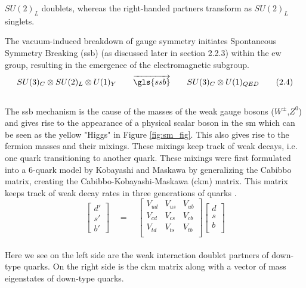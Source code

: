 $SU(2)_{L}$ doublets, whereas the right-handed partners transform as $SU(2)_{L}$ singlets.
 \par
 The vacuum-induced breakdown of gauge symmetry initiates Spontaneous Symmetry Breaking (\gls{ssb}) 
(as discussed later in section 2.2.3) within the \gls{ew} group, resulting in the emergence of the electromagnetic subgroup.
\\
 \begin{equation}\label{eq:2.4} 
    SU(3)_{C} \otimes SU(2)_{L} \otimes U(1)_{Y} \qquad \overrightarrow{\gls{ssb}} \qquad SU(3)_{C} \otimes U(1)_{QED} 
\tag{2.4}
\end{equation}
\\
The \gls{ssb} mechanism is the cause of the masses of the weak gauge bosons ($W^\pm$,$Z^0$) and gives rise 
to the appearance of a physical scalar boson in the \gls{sm} which can be seen as the yellow "Higgs" in 
Figure \ref{fig:sm_fig}. This also gives rise to the fermion masses and their mixings. These mixings keep track
of weak decays, i.e. one quark transitioning to another quark. These mixings were first formulated into 
a 6-quark model by Kobayashi and Maskawa by generalizing the Cabibbo matrix, creating the Cabibbo-Kobayashi-Maskawa (\gls{ckm}) matrix.
This matrix keeps track of weak decay rates in three generations of quarks \cite{ckm}.
\\
\begin{equation}\label{eq:2.5}
    \begin{bmatrix}
        d' \\
        s' \\
        b'
    \end{bmatrix}
    \quad
    =
    \quad
    \begin{bmatrix}
        V_{ud} & V_{us} & V_{ub} \\
        V_{cd} & V_{cs} & V_{cb} \\
        V_{td} & V_{ts} & V_{tb} \\
    \end{bmatrix}
    \begin{bmatrix}
        d \\
        s \\
        b \\
    \end{bmatrix}
\end{equation}
\\
Here we see on the left side are the weak interaction doublet partners of down-type quarks. On
the right side is the \gls{ckm} matrix along with a vector of mass eigenstates of down-type quarks.
